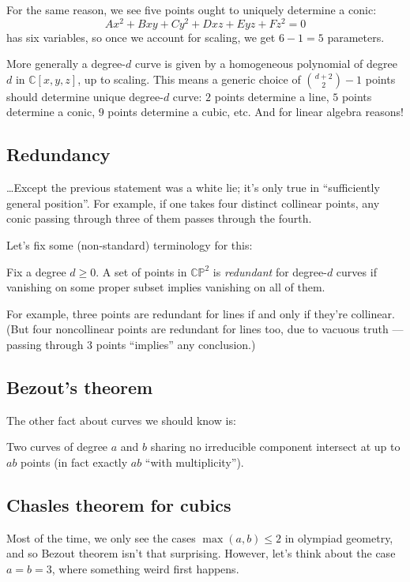 \documentclass[11pt]{scrartcl}
\begin{document}
For the same reason, we see five points ought to uniquely determine a conic:
\[ Ax^2 + Bxy + Cy^2 + Dxz + Eyz + Fz^2 = 0 \]
has six variables, so once we account for scaling, we get $6-1=5$ parameters.

More generally a degree-$d$ curve is given by a homogeneous polynomial of degree $d$ in
$\mathbb C[x,y,z]$, up to scaling.
This means a generic choice of $\binom{d+2}{2}-1$ points
should determine unique degree-$d$ curve: $2$ points determine a line,
$5$ points determine a conic, $9$ points determine a cubic, etc.
And for linear algebra reasons!

\subsection{Redundancy}
\dots Except the previous statement was a white lie;
it's only true in ``sufficiently general position''.
For example, if one takes four distinct collinear points,
any conic passing through three of them passes through the fourth.

Let's fix some (non-standard) terminology for this:
\begin{definition}
  Fix a degree $d \ge 0$.
  A set of points in $\mathbb{CP}^2$ is \emph{redundant} for degree-$d$ curves
  if vanishing on some proper subset implies vanishing on all of them.
\end{definition}
For example, three points are redundant for lines if and only if they're collinear.
(But four noncollinear points are redundant for lines too, due to vacuous truth ---
passing through $3$ points ``implies'' any conclusion.)

\subsection{Bezout's theorem}
The other fact about curves we should know is:
\begin{lemma}
  Two curves of degree $a$ and $b$ sharing no irreducible component
  intersect at up to $ab$ points (in fact exactly $ab$ ``with multiplicity'').
\end{lemma}

\subsection{Chasles theorem for cubics}
Most of the time, we only see the cases $\max(a,b) \le 2$ in olympiad geometry,
and so Bezout theorem isn't that surprising.
However, let's think about the case $a=b=3$, where something weird first happens.
\end{document}
